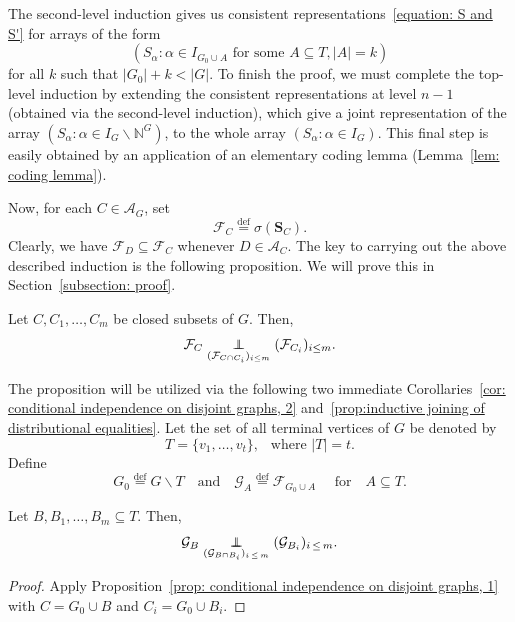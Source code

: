 \documentclass[10pt]{amsart}
\theoremstyle{definition}\newtheorem{defi}[theo]{Definition}\newtheorem{rema}[theo]{Remark}\newtheorem{exam}[theo]{Example}\newtheorem{exem}[theo]{Example}\newtheorem{nota}[theo]{Notation}
\newcommand{\independent}{\protect\mathpalette{\protect\independenT}{\perp}}\def\independenT#1#2{\mathrel{\rlap{$#1#2$}\mkern2mu{#1#2}}}
\newcommand{\alf}{\alpha}%
\newcommand*{\defeq}{\stackrel{\mathrm{def}}{=}}
\newcommand*\N{\mathbb{N}}
\renewcommand{\AA}{\mathcal{A}}
\newcommand*\FF{\mathcal{F}}
\newcommand*\GG{\mathcal{G}}
\newcommand*\bS{\mathbf{S}}
\begin{document}
The second-level induction gives us consistent representations~\eqref{equation: S and S'} for arrays of the form
\[
\left(S_\alpha : \alpha \in I_{G_0 \cup A} \text{ for some } A \subseteq T, |A|=k\right)
\]
for all $k$ such that $|G_0|+k<|G|$.
To finish the proof, we must complete the top-level induction by extending the consistent representations at level $n-1$ (obtained via the second-level induction), which give a joint representation of the array $(S_\alpha : \alpha \in I_G \backslash \N^G)$, to the whole array $(S_\alf : \alpha \in I_G)$. This final step is easily obtained by an application of an elementary coding lemma (Lemma~\ref{lem: coding lemma}).

Now, for each $C \in \AA_G$, set
\begin{equation*}
\mathcal{F}_C
\defeq \sigma(\bS_C).
\end{equation*}
Clearly, we have $\mathcal{F}_D \subseteq \mathcal{F}_C$ whenever $D \in \AA_C$. The key to carrying out the above described induction is the following proposition. We will prove this in Section~\ref{subsection: proof}.
\goodbreak

\begin{prop}\label{prop: conditional independence on disjoint graphs, 1}
Let $C, C_1,\ldots,C_m$ be closed subsets of $G$.
Then,
\[
\FF_C \underset{(\FF_{C \cap C_i})_{i \leq m}}{\independent} (\FF_{C_i})_{i\leq m}.
\]
\end{prop}

The proposition will be utilized via the following two immediate Corollaries~\ref{cor: conditional independence on disjoint graphs, 2} and~\ref{prop:inductive joining of distributional equalities}. Let the set of all terminal vertices of $G$ be denoted by
\begin{equation}\label{eqn:notation:T-t}
T=\{v_1,\ldots,v_t\},\ \ \text{ where }|T|=t.
\end{equation}
Define
\begin{equation}\label{eqn:notation:G0-GGA}
G_0
\defeq G \backslash T
\quad\text{and}\quad
\GG_A
\defeq \FF_{G_0 \cup A}
\quad\text{ for}\quad A \subseteq T.
\end{equation}

\begin{coro}\label{cor: conditional independence on disjoint graphs, 2}
Let $B, B_1,\ldots,B_m \subseteq T$. Then,
\[
\GG_B \underset{(\GG_{B \cap B_i})_{i\,\leq\,m}}{\independent} (\GG_{B_i})_{i\,\leq\,m}.
\]
\end{coro}
\begin{proof}
Apply Proposition~\ref{prop: conditional independence on disjoint graphs, 1} with $C = G_0 \cup B$ and $C_i=G_0 \cup B_i$.
\end{proof}
\end{document}
